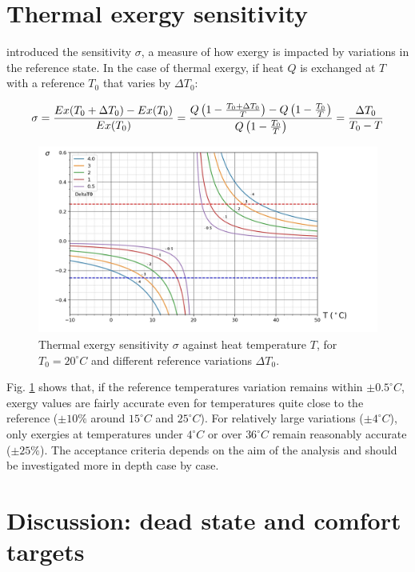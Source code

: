 \documentclass[10pt]{extarticle} %
\begin{document}
\section{Thermal exergy sensitivity} \label{sec:sensitivity}

\cite{Rosen2004} introduced the sensitivity $\sigma$, a measure of how exergy is impacted by variations in the reference state. In the case of thermal exergy, if heat $Q$ is exchanged at $T$ with a reference $T_0$ that varies by $\Delta T_0$: 


\vskip-0.1cm
\begin{equation}
\sigma =  {Ex(T_0+\Delta T_0)-Ex(T_0) \over Ex(T_0)} = { { Q \left( 1-{T_0+ \Delta T_0 \over T} \right) } - { Q \left( 1-{T_0 \over T} \right) } \over { Q \left( 1-{T_0 \over T} \right) } } = { \Delta T_0 \over T_0 - T }
\end{equation}

\vskip-0.2cm
\begin{figure}[h!]
\includegraphics[height=6.2cm, center]{images/sensitivity_2.jpg} 
\caption{Thermal exergy sensitivity $\sigma$ against heat temperature $T$, for $T_0 = 20^\circ C$ and different reference variations $\Delta T_0$.}
\label{fig:sensitivity}
\end{figure}

\vfill \break


\noindent Fig. \ref{fig:sensitivity} shows that, if the reference temperatures variation remains within $\pm 0.5^\circ C$, exergy values are fairly accurate even for temperatures quite close to the reference ($\pm 10 \%$ around $15^\circ C$ and $25^\circ C$). For relatively large variations ($\pm 4^\circ C$), only exergies at temperatures under $4^\circ C$ or over $36^\circ C$ remain reasonably accurate ($\pm 25 \%$). The acceptance criteria depends on the aim of the analysis and should be investigated more in depth case by case. 

\section{Discussion: dead state and comfort targets} 
\end{document}
